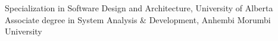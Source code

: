 
\begin{scholarship}
					{Specialization in Software Design and Architecture, University of Alberta}
					{Associate degree in System Analysis \& Development, Anhembi Morumbi University}
\end{scholarship}
